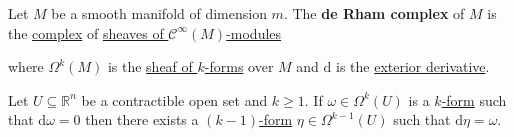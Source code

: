 \documentclass[../../main]{subfiles}
\begin{document}
\begin{definition} \label{def:de-rham-complex}
  Let \(M\) be a smooth manifold of dimension \(m\).
  The \textbf{de Rham complex} of \(M\) is the \hyperref[def:complex]{complex} of \hyperref[def:sheaf-of-modules]{sheaves of \(\mathcal{C}^{\infty}(M)\)-modules}
  \begin{center}
  \end{center}
  where \(\Omega^{k}(M)\) is the \hyperref[def:smooth-k-form]{sheaf of \(k\)-forms} over \(M\) and \(\mathrm{d}\) is the \hyperref[def:exterior-derivative-k-form]{exterior derivative}.
\end{definition}

\begin{lemma}[Poincaré] \label{lemma:poincare}
  Let \(U \subseteq \mathbb{R}^{n}\) be a contractible open set and \(k \geq 1\).
  If \(\omega \in \Omega^{k}(U)\) is a \hyperref[def:smooth-k-form]{\(k\)-form} such that \(\mathrm{d}\omega = 0\) then there exists a \hyperref[def:smooth-k-form]{\((k-1)\)-form} \(\eta \in \Omega^{k-1}(U)\) such that \(\mathrm{d}\eta = \omega\).
\end{lemma}
\end{document}
